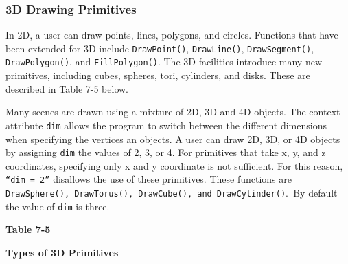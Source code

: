 \subsubsection{3D Drawing Primitives}

In 2D, a user can draw points, lines, polygons, and circles. Functions
that have been extended for 3D include
\texttt{DrawPoint()}, \texttt{DrawLine()}, \texttt{DrawSegment()},
\texttt{DrawPolygon()}, and \texttt{FillPolygon()}. The 3D facilities
introduce many new primitives, including cubes, spheres, tori,
cylinders, and disks. These are described in Table 7-5 below.

Many scenes are drawn using a mixture of 2D, 3D and 4D objects. The
context attribute \texttt{dim} allows the program to switch between the
different dimensions when specifying the vertices an objects. A user
can draw 2D, 3D, or 4D objects by assigning \texttt{dim} the values of
2, 3, or 4. For primitives that take x, y, and z coordinates,
specifying only x and y coordinate is not sufficient. For this reason,
\texttt{{\textquotedblleft}dim = 2{\textquotedblright}} disallows the
use of these primitives. These functions are
\texttt{DrawSphere()}\texttt{, }\texttt{DrawTorus()}\texttt{,
}\texttt{DrawCube()}\texttt{, and }\texttt{DrawCylinder()}.\texttt{ }By
default the value of \texttt{dim} is three.

\bigskip

{\centering\sffamily\bfseries
Table 7-5
\par}

{\centering\sffamily\bfseries
Types of 3D Primitives
\par}

